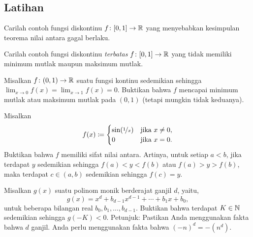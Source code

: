 \begin{myfigureht}
\caption{Citra fungsi kontinu $f \colon [a,b] \to \R$.\label{fig:imageinterval}}
\end{myfigureht}

\subsection{Latihan}

\begin{exercise}
Carilah contoh fungsi diskontinu $f \colon [0,1] \to {\mathbb{R}}$
yang menyebabkan kesimpulan teorema nilai antara gagal berlaku.
\end{exercise}

\begin{exercise}
Carilah contoh fungsi diskontinu \emph{terbatas} $f \colon [0,1]
\to {\mathbb{R}}$ yang tidak memiliki minimum mutlak maupun maksimum mutlak.
\end{exercise}

\begin{exercise}
Misalkan $f \colon (0,1) \to {\mathbb{R}}$ suatu fungsi kontinu sedemikian sehingga
$\displaystyle \lim_{x\to 0} f(x) =
\displaystyle \lim_{x\to 1} f(x) = 0$.  Buktikan bahwa
$f$ mencapai minimum mutlak atau maksimum mutlak pada $(0,1)$
(tetapi mungkin tidak keduanya).
\end{exercise}

\begin{exercise} \label{exercise:meanvaluepropsin1x}
Misalkan
\begin{equation*}
f(x) \coloneqq
\begin{cases}
\sin(\nicefrac{1}{x}) & \text{jika } x \neq 0, \\
0 & \text{jika } x=0.
\end{cases}
\end{equation*}
Buktikan bahwa $f$ memiliki sifat nilai antara.
Artinya, untuk setiap $a < b$, jika terdapat $y$ sedemikian sehingga $f(a) < y < f(b)$
atau $f(a) > y > f(b)$, maka
terdapat $c \in (a,b)$ sedemikian sehingga $f(c) = y$.
\end{exercise}

\begin{exercise} \label{exercise:odddegnegativeK}
Misalkan $g(x)$ suatu polinom monik berderajat ganjil $d$, yaitu,
\begin{equation*}
g(x) = x^d + b_{d-1} x^{d-1} + \cdots + b_1 x + b_0 ,
\end{equation*}
untuk beberapa bilangan real $b_{0}, b_1, \ldots, b_{d-1}$.  Buktikan bahwa terdapat
$K \in {\mathbb{N}}$ sedemikian sehingga $g(-K) < 0$.  Petunjuk: Pastikan Anda menggunakan fakta bahwa
$d$ ganjil.  Anda perlu menggunakan fakta bahwa ${(-n)}^d = -(n^d)$.
\end{exercise}

